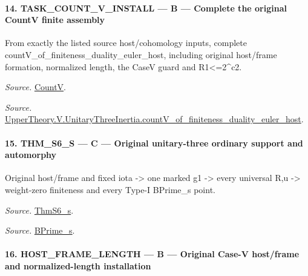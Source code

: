 \documentclass[11pt,a4paper]{article}
\numberwithin{equation}{section}
\theoremstyle{remark}\newtheorem{remark}[theorem]{Remark}
\begin{document}
\paragraph{14. TASK\_\allowbreak COUNT\_\allowbreak V\_\allowbreak INSTALL — B — Complete the original CountV finite assembly}

From exactly the listed source host/cohomology inputs, complete countV\_\allowbreak of\_\allowbreak finiteness\_\allowbreak duality\_\allowbreak euler\_\allowbreak host, including original host/frame formation, normalized length, the CaseV guard and R1<=2\textasciicircum{}c2.

\emph{Source.} \href{https://github.com/CocoSgt/riemann-hypothesis-lean/blob/7cbf7a0c32fca1badf05931879a37c3f8a2b03b4/src/Development/AutomorphicArithmetic/AutomorphicVarieties/HeightAndVanishing/Counts.lean#L69-L69}{CountV}.

\emph{Source.} \href{https://github.com/CocoSgt/riemann-hypothesis-lean/blob/7cbf7a0c32fca1badf05931879a37c3f8a2b03b4/src/Development/AutomorphicArithmetic/AutomorphicVarieties/ModularityArgument/ThresholdArguments/DenseThresholdCases/CountVOf.lean#L33-L60}{UpperTheory.V.UnitaryThreeInertia.countV\_\allowbreak of\_\allowbreak finiteness\_\allowbreak duality\_\allowbreak euler\_\allowbreak host}.



\paragraph{15. THM\_\allowbreak S6\_\allowbreak S — C — Original unitary-three ordinary support and automorphy}

Original host/frame and fixed iota -> one marked g1 -> every universal R,u -> weight-zero finiteness and every Type-I BPrime\_\allowbreak s point.

\emph{Source.} \href{https://github.com/CocoSgt/riemann-hypothesis-lean/blob/7cbf7a0c32fca1badf05931879a37c3f8a2b03b4/src/Development/AutomorphicArithmetic/AutomorphicVarieties/ModularityArgument/ThresholdArguments/DenseThresholdCases/ThmS6CoreS.lean#L17-L26}{ThmS6\_\allowbreak s}.

\emph{Source.} \href{https://github.com/CocoSgt/riemann-hypothesis-lean/blob/7cbf7a0c32fca1badf05931879a37c3f8a2b03b4/src/Development/AutomorphicArithmetic/AutomorphicVarieties/ModularityArgument/ThresholdArguments/DenseThresholdCases/ThmS6CoreS.lean#L12-L16}{BPrime\_\allowbreak s}.



\paragraph{16. HOST\_\allowbreak FRAME\_\allowbreak LENGTH — B — Original Case-V host/frame and normalized-length installation}
\end{document}
